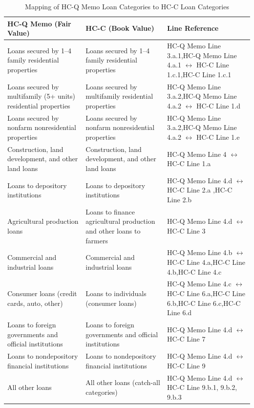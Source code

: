 \documentclass[conference]{IEEEtran}
\begin{document}
\begin{table}[htbp]
	\centering
	\caption{Mapping of HC-Q Memo Loan Categories to HC-C Loan Categories}
	\begin{tabular}{|p{2.5cm}|p{2.5cm}|p{2cm}|}
		\hline
		\textbf{HC-Q Memo (Fair Value)} & \textbf{HC-C (Book Value)} & \textbf{Line Reference} \\
		\hline
		Loans secured by 1–4 family residential properties & Loans secured by 1–4 family residential properties & HC-Q Memo Line 3.a.1,HC-Q Memo Line 4.a.1 $\leftrightarrow$ HC-C Line 1.c.1,HC-C Line 1.c.1 \\
		\hline
		Loans secured by multifamily (5+ units) residential properties & Loans secured by multifamily residential properties & HC-Q Memo Line 3.a.2,HC-Q Memo Line 4.a.2 $\leftrightarrow$ HC-C Line 1.d \\
		\hline
		Loans secured by nonfarm nonresidential properties & Loans secured by nonfarm nonresidential properties & HC-Q Memo Line 3.a.2,HC-Q Memo Line 4.a.2 $\leftrightarrow$ HC-C Line 1.e \\
		\hline
		Construction, land development, and other land loans & Construction, land development, and other land loans & HC-Q Memo Line 4 $\leftrightarrow$ HC-C Line 1.a \\
		\hline
		Loans to depository institutions & Loans to depository institutions & HC-Q Memo Line 4.d $\leftrightarrow$ HC-C Line 2.a ,HC-C Line 2.b\\
		\hline
		Agricultural production loans & Loans to finance agricultural production and other loans to farmers & HC-Q Memo Line 4.d $\leftrightarrow$ HC-C Line 3 \\
		\hline
		Commercial and industrial loans & Commercial and industrial loans & HC-Q Memo Line 4.b $\leftrightarrow$ HC-C Line 4.a,HC-C Line 4.b,HC-C Line 4.c \\
		\hline
		Consumer loans (credit cards, auto, other) & Loans to individuals (consumer loans) & HC-Q Memo Line 4.c $\leftrightarrow$ HC-C Line 6.a,HC-C Line 6.b,HC-C Line 6.c,HC-C Line 6.d \\
		\hline
		Loans to foreign governments and official institutions & Loans to foreign governments and official institutions & HC-Q Memo Line 4.d $\leftrightarrow$ HC-C Line 7 \\
		\hline
		Loans to nondepository financial institutions & Loans to nondepository financial institutions & HC-Q Memo Line 4.d $\leftrightarrow$ HC-C Line 9 \\
		\hline
		All other loans & All other loans (catch-all categories) & HC-Q Memo Line 4.d $\leftrightarrow$ HC-C Line 9.b.1, 9.b.2, 9.b.3 \\
		\hline
	\end{tabular}
\end{table}
\end{document}

